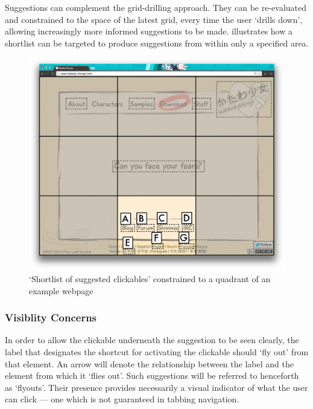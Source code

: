 \documentclass[11pt,openright,a4paper]{report}
\begin{document}
\FloatBarrier
Suggestions can complement the grid-drilling approach. They can be re-evaluated and constrained to the space of the latest grid, every time the user `drills down', allowing increasingly more informed suggestions to be made.  illustrates how a shortlist can be targeted to produce suggestions from within only a specified area.

\begin{figure}[ht]
\centering\includegraphics[width=\textwidth]{figures/FilteredSuggestions.png}
\caption{`Shortlist of suggested clickables' constrained to a quadrant of an example webpage}
\label{fig:filteredsuggestions}
\end{figure}

\FloatBarrier
\subsubsection{Visiblity Concerns}
In order to allow the clickable underneath the suggestion to be seen clearly, the label that designates the shortcut for activating the clickable should `fly out' from that element. An arrow will denote the relationship between the label and the element from which it `flies out'. Such suggestions will be referred to henceforth as `flyouts'. Their presence provides necessarily a visual indicator of what the user can click --- one which is not guaranteed in tabbing navigation.
\end{document}
